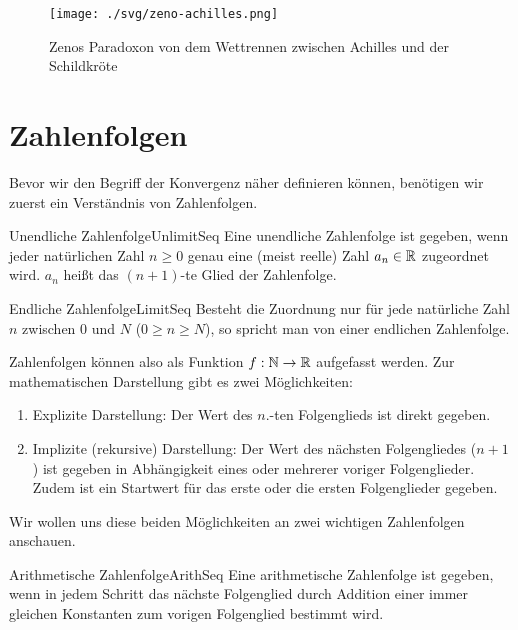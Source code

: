 \begin{figure}
	\centering
	\texttt{[image: ./svg/zeno-achilles.png]}
	\caption{Zenos Paradoxon von dem Wettrennen zwischen Achilles und der Schildkröte}
	\label{fig:ZenoAchilles}
\end{figure}

\section{Zahlenfolgen}

Bevor wir den Begriff der Konvergenz näher definieren können, benötigen wir zuerst ein Verständnis von Zahlenfolgen.

\begin{definition}{Unendliche Zahlenfolge}{UnlimitSeq}
	Eine unendliche Zahlenfolge ist gegeben, wenn jeder natürlichen Zahl $n \ge 0$  genau eine (meist reelle) Zahl $a_n\in\mathbb{R}$ zugeordnet wird. $a_n$ heißt das $(n+1)$-te Glied der Zahlenfolge.
\end{definition}

\begin{definition}{Endliche Zahlenfolge}{LimitSeq}
	Besteht die Zuordnung nur für jede natürliche Zahl $n$ zwischen 0 und $N$ ($0 \ge n \ge N$), so spricht man von einer endlichen Zahlenfolge.
\end{definition}

Zahlenfolgen können also als Funktion $f: \mathbb{N} \to \mathbb{R}$ aufgefasst werden. Zur mathematischen Darstellung gibt es zwei Möglichkeiten:

\begin{enumerate}
	\item Explizite Darstellung: Der Wert des $n$.-ten Folgenglieds ist direkt gegeben.
	\item Implizite (rekursive) Darstellung: Der Wert des nächsten Folgengliedes ($n+1$) ist gegeben in Abhängigkeit eines oder mehrerer voriger Folgenglieder. Zudem ist ein Startwert für das erste oder die ersten Folgenglieder gegeben.
\end{enumerate}

Wir wollen uns diese beiden Möglichkeiten an zwei wichtigen Zahlenfolgen anschauen.

\begin{definition}{Arithmetische Zahlenfolge}{ArithSeq}
	Eine arithmetische Zahlenfolge ist gegeben, wenn in jedem Schritt das nächste Folgenglied durch Addition einer immer gleichen Konstanten zum vorigen Folgenglied bestimmt wird.
\end{definition}

